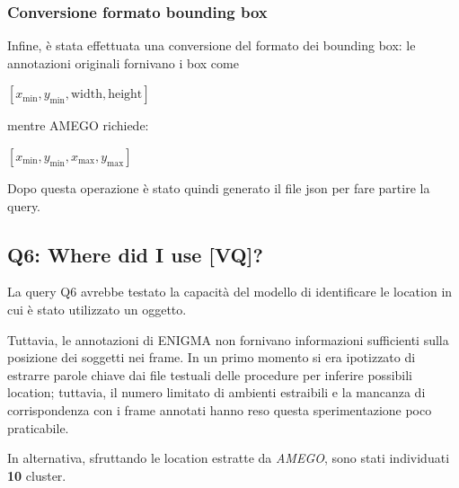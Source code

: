 \subsubsection*{Conversione formato bounding box}
Infine, è stata effettuata una conversione del formato dei bounding box: le annotazioni originali fornivano i box come 
\begin{center}
\([x_\text{min}, y_\text{min}, \text{width}, \text{height}]\)
\end{center}

mentre AMEGO richiede:
\begin{center}
\([x_\text{min}, y_\text{min}, x_\text{max}, y_\text{max}]\)
\end{center}

Dopo questa operazione è stato quindi generato il file json per fare partire la query.

\subsection*{Q6: Where did I use [VQ]?}
La query Q6 avrebbe testato la capacità del modello di identificare le location in cui è stato utilizzato un oggetto.

Tuttavia, le annotazioni di ENIGMA non fornivano informazioni sufficienti sulla posizione dei soggetti nei frame. In un primo momento si era ipotizzato di estrarre parole chiave dai file testuali delle procedure per inferire possibili location; tuttavia, il numero limitato di ambienti estraibili e la mancanza di corrispondenza con i frame annotati hanno reso questa sperimentazione poco praticabile.  

In alternativa, sfruttando le location estratte da \emph{AMEGO}, sono stati individuati \textbf{10} cluster.

